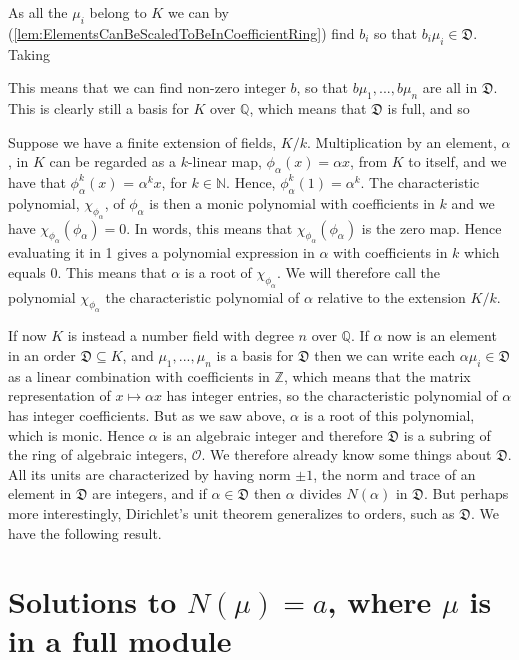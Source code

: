 \documentclass{article}
\newcommand{\mfrak}[1]{\mathfrak{#1}}
\newcommand{\mcal}[1]{\mathcal{#1}}
\newcommand{\mbb}[1]{\mathbb{#1}}
\begin{document}
As all the $\mu_i$ belong to $K$ we can by (\ref{lem:ElementsCanBeScaledToBeInCoefficientRing}) find $b_i$ so that $b_i \mu_i \in \mfrak D$. Taking 


This means that we can find non-zero integer $b$, so that $b \mu_1, ..., b \mu_n$ are all in $\mfrak D$. This is clearly still a basis for $K$ over $\mbb Q$, which means that $\mfrak D$ is full, and so



Suppose we have a finite extension of fields, $K / k$. Multiplication by an element, $\alpha$, in $K$ can be regarded as a $k$-linear map, $\phi_\alpha(x) = \alpha x$, from $K$ to itself, and we have that $\phi_\alpha^k(x)$ = $\alpha^k x$, for $k \in \mbb N$. Hence, $\phi_\alpha^k(1) = \alpha^k$. The characteristic polynomial, $\chi_{\phi_\alpha}$, of $\phi_\alpha$ is then a monic polynomial with coefficients in $k$ and we have $\chi_{\phi_\alpha}(\phi_\alpha) = 0$. In words, this means that $\chi_{\phi_\alpha}(\phi_\alpha)$ is the zero map. Hence evaluating it in 1 gives a polynomial expression in $\alpha$ with coefficients in $k$ which equals 0. This means that $\alpha$ is a root of $\chi_{\phi_\alpha}$. We will therefore call the polynomial $\chi_{\phi_\alpha}$ the characteristic polynomial of $\alpha$ relative to the extension $K / k$.

If now $K$ is instead a number field with degree $n$ over $\mbb{Q}$. If $\alpha$ now is an element in an order $\mfrak D \subseteq K$, and $\mu_1,  ..., \mu_n$ is a basis for $\mfrak D$ then we can write each $\alpha \mu_i \in \mfrak D$ as a linear combination with coefficients in $\mbb Z$, which means that the matrix representation of $x \mapsto \alpha x$ has integer entries, so the characteristic polynomial of $\alpha$ has integer coefficients. But as we saw above, $\alpha$ is a root of this polynomial, which is monic. Hence $\alpha$ is an algebraic integer and therefore $\mfrak D$ is a subring of the ring of algebraic integers, $\mcal O$. We therefore already know some things about $\mfrak D$. All its units are characterized by having norm $\pm 1$, the norm and trace of an element in $\mfrak D$ are integers, and if $\alpha \in \mfrak{D}$ then $\alpha$ divides $N(\alpha)$ in $\mfrak D$. But perhaps more interestingly, Dirichlet's unit theorem generalizes to orders, such as $\mfrak D$. We have the following result.




\section{Solutions to $N(\mu) = a$, where $\mu$ is in a full module}
\end{document}
